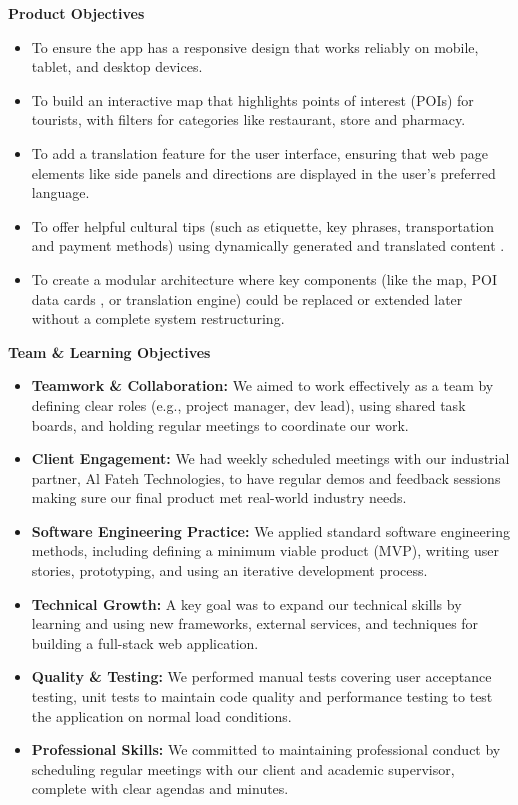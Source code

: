 \textbf{Product Objectives}
\begin{itemize}
\item To ensure the app has a responsive design that works reliably on mobile, tablet, and desktop devices.
\item To build an interactive map that highlights points of interest (POIs) for tourists, with filters for categories like restaurant, store and pharmacy.
\item To add a translation feature for the user interface, ensuring that web page elements like side panels and directions are displayed in the user’s preferred language.
\item To offer helpful cultural tips (such as etiquette, key phrases, transportation and payment methods) using dynamically generated and translated content \cite{gpt_culturetips}.
\item To create a modular architecture where key components (like the map, POI data cards , or translation engine) could be replaced or extended later without a complete system restructuring.
\end{itemize}

\textbf{Team \& Learning Objectives}
\begin{itemize}
\item \textbf{Teamwork \& Collaboration:} We aimed to work effectively as a team by defining clear roles (e.g., project manager, dev lead), using shared task boards, and holding regular meetings to coordinate our work.
\item \textbf{Client Engagement:} We had weekly scheduled meetings with our industrial partner, Al Fateh Technologies, to have regular demos and feedback sessions making sure our final product met real-world industry needs.
\item \textbf{Software Engineering Practice:} We applied standard software engineering methods, including defining a minimum viable product (MVP), writing user stories, prototyping, and using an iterative development process.
\item \textbf{Technical Growth:} A key goal was to expand our technical skills by learning and using new frameworks, external services, and techniques for building a full-stack web application.
\item \textbf{Quality \& Testing:} We performed manual tests covering user acceptance testing, unit tests to maintain code quality and performance testing to test the application on normal load conditions.
\item \textbf{Professional Skills:} We committed to maintaining professional conduct by scheduling regular meetings with our client and academic supervisor, complete with clear agendas and minutes.
\end{itemize}

